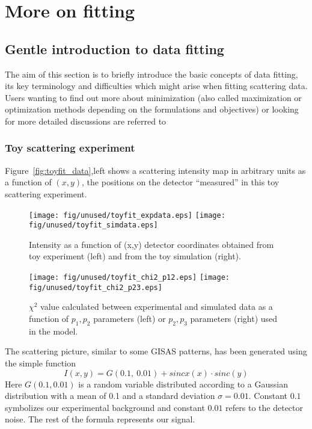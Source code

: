 \chapter{More on fitting}

\section{Gentle introduction to data fitting}

The aim of this section is to briefly introduce the basic concepts of
data fitting, its key terminology and difficulties which might arise
when fitting scattering data.
Users wanting to find out more about minimization (also called
maximization or optimization methods depending on the formulations and objectives) 
or looking for more detailed discussions are referred to \cite{AnLu07, mntutorial}

\subsection{Toy scattering experiment}

Figure~\ref{fig:toyfit_data},left shows a scattering intensity map in arbitrary units  
as a function of $(x,y)$, the positions on the detector ``measured'' in this toy scattering experiment.

\begin{figure}[!p]
  \centering
    \texttt{[image: fig/unused/toyfit\_expdata.eps]}
    \texttt{[image: fig/unused/toyfit\_simdata.eps]}
  \caption{Intensity as a function of (x,y) detector coordinates  obtained from 
  toy experiment (left) and from the toy simulation (right).   }
  \label{fig:toyfit_data}
  \vspace*{4mm}
    \texttt{[image: fig/unused/toyfit\_chi2\_p12.eps]}
    \texttt{[image: fig/unused/toyfit\_chi2\_p23.eps]}
  \caption{$\chi^{2}$ value calculated between experimental and simulated data
  as a function of $p_1,p_2$ parameters (left) or $p_2,p_3$ 
  parameters (right) used in the model.   }
  \label{fig:toyfit_chi2}
\end{figure}


The scattering picture, similar to some GISAS patterns, has been generated using the simple function
$$I(x,y) = G(0.1,~0.01) + sincx(x) \cdot sinc(y)$$
Here $G(0.1, 0.01)$ is a random variable distributed according to a Gaussian distribution
with a mean of 0.1 and a standard deviation $\sigma=0.01$.
Constant $0.1$ symbolizes our experimental background and constant $0.01$ refers
to the detector noise. The rest of the formula represents our signal.

